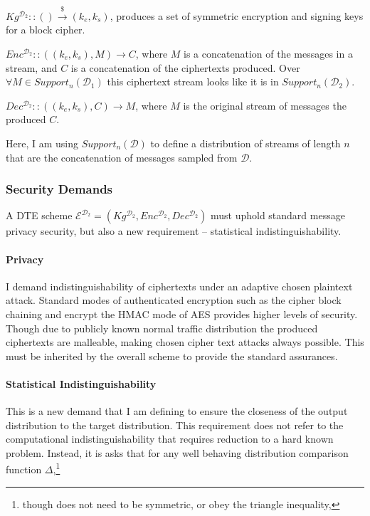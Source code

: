 \documentclass[ %
                    author={Samuel Russell},
                supervisor={Prof. Bogdan Warinschi},
                    degree={MEng},
                     title={Innocuous Ciphertexts},
                  subtitle={The DE-CENSOR Scheme},
                      type={research},
                      year={2018} ]{dissertation}
\begin{document}
$Kg^{\mathcal{D}_2} :: () \xrightarrow{\$} (k_e,k_s)$, produces a set of symmetric encryption and signing keys for a block cipher.

$Enc^{\mathcal{D}_2} :: ((k_e,k_s), M) \rightarrow C$, where $M$ is a concatenation of the messages in a stream, and $C$ is a concatenation of the ciphertexts produced. Over $\forall M \in Support_n(\mathcal{D}_1)$ this ciphertext stream looks like it is in  $Support_n(\mathcal{D}_2)$.

$Dec^{\mathcal{D}_2} :: ((k_e,k_s), C) \rightarrow M$, where $M$ is the original stream of messages the produced $C$.

Here, I am using $Support_n(\mathcal{D})$ to define a distribution of streams of length $n$ that are the concatenation of messages sampled from $\mathcal{D}$.

\subsubsection{Security Demands}

A DTE scheme $\mathcal{E}^{\mathcal{D}_2} = (Kg^{\mathcal{D}_2}, Enc^{\mathcal{D}_2}, Dec^{\mathcal{D}_2})$ must uphold standard message privacy security, but also a new requirement -- statistical indistinguishability.

\paragraph{Privacy}
 
I demand indistinguishability of ciphertexts under an adaptive chosen plaintext attack. Standard modes of authenticated encryption such as the cipher block chaining and encrypt the HMAC mode of AES provides higher levels of security.
Though due to publicly known normal traffic distribution the produced ciphertexts are malleable, making chosen cipher text attacks always possible. 
This must be inherited by the overall scheme to provide the standard assurances.

\paragraph{Statistical Indistinguishability}

This is a new demand that I am defining to ensure the closeness of the output distribution to the target distribution.
This requirement does not refer to the computational indistinguishability that requires reduction to a hard known problem.
Instead, it is asks that for any well behaving distribution comparison function $\Delta$,\footnote{though does not need to be symmetric, or obey the triangle inequality,}
\end{document}
